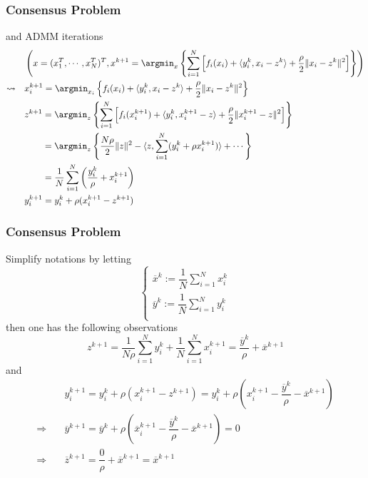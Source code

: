 \begin{frame}
\frametitle{Consensus Problem}

and ADMM iterations
{\scriptsize
\begin{align*}
    \phantom{\leadsto} & \left( x = (x_1^T,\cdots,x_N^T)^T, x^{k+1} = \argmin_x \left\{ \sum\limits_{i=1}^N \left[ f_i(x_i) + \langle y^k_i, x_i-z^k \rangle + \dfrac{\rho}{2} \lVert x_i-z^k \rVert^2 \right] \right\} \right) \\
    \leadsto \quad & x_i^{k+1} = \argmin_{x_i} \left\{ f_i(x_i) + \langle y^k_i, x_i-z^k \rangle + \dfrac{\rho}{2} \lVert x_i-z^k \rVert^2 \right\} \\
    & z^{k+1} = \argmin_{z} \left\{ \sum\limits_{i=1}^N \left[ f_i(x_i^{k+1}) + \langle y^k_i, x_i^{k+1}-z \rangle + \dfrac{\rho}{2} \lVert x_i^{k+1}-z \rVert^2 \right] \right\} \\
    & \phantom{z^{k+1}} = \argmin_{z} \left\{ \dfrac{N\rho}{2} \lVert z \rVert^2 - \langle z, \sum\limits_{i=1}^N (y_i^k+\rho x_i^{k+1}) \rangle + \cdots \right\} \\
    & \phantom{z^{k+1}} = \dfrac{1}{N} \sum\limits_{i=1}^N \left( \dfrac{y_i^{k}}{\rho} + x_i^{k+1} \right) \\
    & y_i^{k+1} = y_i^k + \rho (x_i^{k+1} - z^{k+1})
\end{align*}
}

\end{frame}


\begin{frame}
\frametitle{Consensus Problem}

Simplify notations by letting
$$
\begin{cases}
\overline{x}^k := \dfrac{1}{N} \sum\limits_{i=1}^N x_i^k \\
\overline{y}^k := \dfrac{1}{N} \sum\limits_{i=1}^N y_i^k \\
\end{cases}
$$
then one has the following observations
$$\displaystyle z^{k+1} = \dfrac{1}{N\rho} \sum\limits_{i=1}^N y_i^k + \dfrac{1}{N} \sum\limits_{i=1}^N x_i^{k+1} = \dfrac{\overline{y}^k}{\rho} + \overline{x}^{k+1}$$
and
\begin{align*}
    & y^{k+1}_i = y_i^k + \rho(x_i^{k+1}-z^{k+1}) = y_i^k + \rho(x_i^{k+1}-\dfrac{\overline{y}^k}{\rho} - \overline{x}^{k+1}) \\
    \Rightarrow \quad & \overline{y}^{k+1} = \overline{y}^{k} + \rho (\overline{x}_i^{k+1} - \dfrac{\overline{y}^k}{\rho} - \overline{x}^{k+1}) = 0 \\
    \Rightarrow \quad & \overline{z}^{k+1} = \dfrac{0}{\rho} + \overline{x}^{k+1} = \overline{x}^{k+1} \\
\end{align*}

\end{frame}

